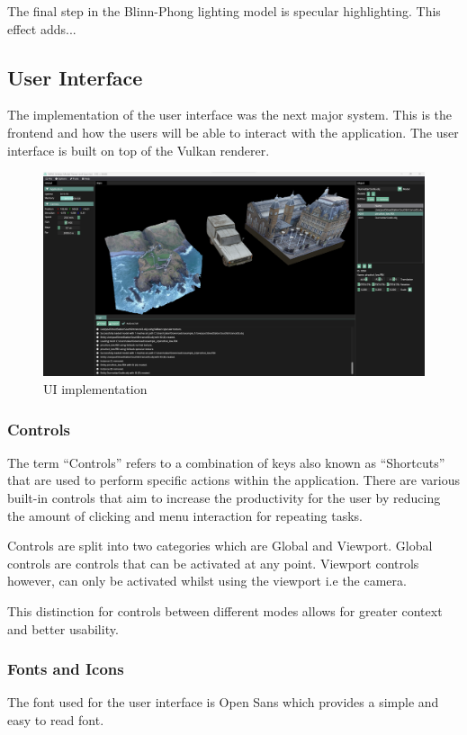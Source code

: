 \documentclass[11pt]{article}
\begin{document}
The final step in the Blinn-Phong lighting model is specular highlighting. This effect
adds...


\subsection{User Interface}
The implementation of the user interface was the next major system. This is
the frontend and how the users will be able to interact with the application.
The user interface is built on top of the Vulkan renderer.


\begin{figure}[h!]
  \centering
  \includegraphics[width=\textwidth]{images/ui_implementation.png}
  \caption{UI implementation}
  \label{fig:user_interface}
\end{figure}


\subsubsection{Controls}
The term ``Controls'' refers to a combination of keys also known as
``Shortcuts'' that are used to perform specific actions within the application.
There are various  built-in controls that aim to increase the productivity for
the user by reducing the amount of clicking and menu interaction for repeating tasks.

Controls are split into two categories which are Global and Viewport. Global controls
are controls that can be activated at any point. Viewport controls however, can only 
be activated whilst using the viewport i.e the camera.

This distinction for controls between different modes allows for greater context and
better usability. 






\subsubsection{Fonts and Icons}
The font used for the user interface is Open Sans which provides a simple and
easy to read font.
\end{document}
